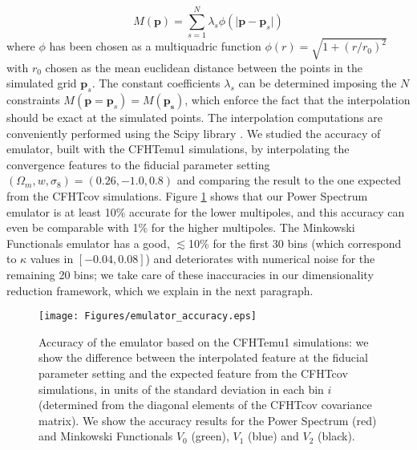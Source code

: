 \documentclass[reprint,aps,prd,superscriptaddress,showkeys,showpacs]{revtex4-1}
\begin{document}
\begin{equation}
M(\mathbf{p}) = \sum_{s=1}^N \lambda_s\phi(\vert\mathbf{p}-\mathbf{p}_s\vert)
\end{equation}
%
where $\phi$ has been chosen as a multiquadric function $\phi(r)=\sqrt{1+(r/r_0)^2}$ with $r_0$ chosen as the mean euclidean distance between the points in the simulated grid $\mathbf{p}_s$. The constant coefficients $\lambda_s$ can be determined imposing the $N$ constraints $M(\mathbf{p}=\mathbf{p}_s)=M(\mathbf{p_s})$, which enforce the fact that the interpolation should be exact at the simulated points. The interpolation computations are conveniently performed using the Scipy library \citep{scipy}. We studied the accuracy of emulator, built with the CFHTemu1 simulations, by interpolating the convergence features to the fiducial parameter setting $(\Omega_m,w,\sigma_8)=(0.26,-1.0,0.8)$ and comparing the result to the one expected from the CFHTcov simulations. Figure \ref{emulatorAccuracy} shows that our Power Spectrum emulator is at least 10\% accurate for the lower multipoles, and this accuracy can even be comparable with 1\% for the higher multipoles. The Minkowski Functionals emulator has a good, $\lesssim$10\% for the first 30 bins (which correspond to $\kappa$ values in $[-0.04,0.08]$) and deteriorates with numerical noise for the remaining 20 bins; we take care of these inaccuracies in our dimensionality reduction framework, which we explain in the next paragraph. 

\begin{figure}
\begin{center}
\texttt{[image: Figures/emulator\_accuracy.eps]}
\end{center}
\caption{Accuracy of the emulator based on the CFHTemu1 simulations: we show the difference between the interpolated feature at the fiducial parameter setting and the expected feature from the CFHTcov simulations, in units of the standard deviation in each bin $i$ (determined from the diagonal elements of the CFHTcov covariance matrix). We show the accuracy results for the Power Spectrum (red) and Minkowski Functionals $V_0$ (green), $V_1$ (blue) and $V_2$ (black).}
\label{emulatorAccuracy}
\end{figure}  
\end{document}
